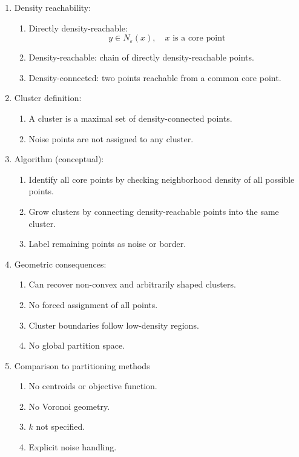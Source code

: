\documentclass{article}
\begin{document}
\begin{enumerate}
\item Density reachability:
\begin{enumerate}
\item Directly density-reachable:
\[
y \in N_{\varepsilon}(x), \quad x \text{ is a core point}
\]
\item Density-reachable: chain of directly density-reachable points.
\item Density-connected: two points reachable from a common core point.
\end{enumerate}

\item Cluster definition:
\begin{enumerate}
\item A cluster is a maximal set of density-connected points.
\item Noise points are not assigned to any cluster.
\end{enumerate}

\item Algorithm (conceptual):
\begin{enumerate}
\item Identify all core points by checking neighborhood density of all possible points.
\item Grow clusters by connecting density-reachable points into the same cluster.
\item Label remaining points as noise or border.
\end{enumerate}

\item Geometric consequences:
\begin{enumerate}
\item Can recover non-convex and arbitrarily shaped clusters.
\item No forced assignment of all points.
\item Cluster boundaries follow low-density regions.
\item No global partition space.
\end{enumerate}

\item Comparison to partitioning methods
\begin{enumerate}
\item No centroids or objective function.
\item No Voronoi geometry.
\item $k$ not specified.
\item Explicit noise handling.
\end{enumerate}


\end{enumerate}
\end{document}
